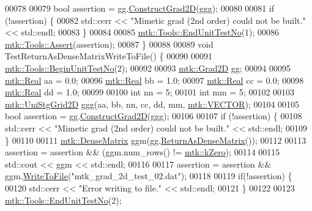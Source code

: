 \begin{DoxyCode}
00078 
00079   \textcolor{keywordtype}{bool} assertion = gg.\hyperlink{classmtk_1_1Grad2D_a9771be954c59880e3d83f4d645378c00}{ConstructGrad2D}(ggg);
00080 
00081   \textcolor{keywordflow}{if} (!assertion) \{
00082     std::cerr << \textcolor{stringliteral}{"Mimetic grad (2nd order) could not be built."} << std::endl;
00083   \}
00084 
00085   \hyperlink{classmtk_1_1Tools_ad8cf0085133dd40c913fe195bc5b9694}{mtk::Tools::EndUnitTestNo}(1);
00086   \hyperlink{classmtk_1_1Tools_aa311fada9255627d06c56b1e4fedce9e}{mtk::Tools::Assert}(assertion);
00087 \}
00088 
00089 \textcolor{keywordtype}{void} TestReturnAsDenseMatrixWriteToFile() \{
00090 
00091   \hyperlink{classmtk_1_1Tools_a26ee906d28523378522a75e25c3a4e19}{mtk::Tools::BeginUnitTestNo}(2);
00092 
00093   \hyperlink{classmtk_1_1Grad2D}{mtk::Grad2D} gg;
00094 
00095   \hyperlink{group__c01-roots_gac080bbbf5cbb5502c9f00405f894857d}{mtk::Real} aa = 0.0;
00096   \hyperlink{group__c01-roots_gac080bbbf5cbb5502c9f00405f894857d}{mtk::Real} bb = 1.0;
00097   \hyperlink{group__c01-roots_gac080bbbf5cbb5502c9f00405f894857d}{mtk::Real} cc = 0.0;
00098   \hyperlink{group__c01-roots_gac080bbbf5cbb5502c9f00405f894857d}{mtk::Real} dd = 1.0;
00099 
00100   \textcolor{keywordtype}{int} nn = 5;
00101   \textcolor{keywordtype}{int} mm = 5;
00102 
00103   \hyperlink{classmtk_1_1UniStgGrid2D}{mtk::UniStgGrid2D} ggg(aa, bb, nn, cc, dd, mm, \hyperlink{namespacemtk_ga4c54f2a329cfb4e56213b02a259d19e2a3d8cb27a993651a74d67fb8c98ae91b2}{mtk::VECTOR});
00104 
00105   \textcolor{keywordtype}{bool} assertion = gg.\hyperlink{classmtk_1_1Grad2D_a9771be954c59880e3d83f4d645378c00}{ConstructGrad2D}(ggg);
00106 
00107   \textcolor{keywordflow}{if} (!assertion) \{
00108     std::cerr << \textcolor{stringliteral}{"Mimetic grad (2nd order) could not be built."} << std::endl;
00109   \}
00110 
00111   \hyperlink{classmtk_1_1DenseMatrix}{mtk::DenseMatrix} ggm(gg.\hyperlink{classmtk_1_1Grad2D_a4f5a17519455f833bb70b8434c272312}{ReturnAsDenseMatrix}());
00112 
00113   assertion = assertion && (ggm.num\_rows() != \hyperlink{group__c01-roots_ga59a451a5fae30d59649bcda274fea271}{mtk::kZero});
00114 
00115   std::cout << ggm << std::endl;
00116 
00117   assertion = assertion && ggm.\hyperlink{classmtk_1_1DenseMatrix_a783d5ea89262d4e2eeb14b9c1ecd0063}{WriteToFile}(\textcolor{stringliteral}{"mtk\_grad\_2d\_test\_02.dat"});
00118 
00119   \textcolor{keywordflow}{if}(!assertion) \{
00120     std::cerr << \textcolor{stringliteral}{"Error writing to file."} << std::endl;
00121   \}
00122 
00123   \hyperlink{classmtk_1_1Tools_ad8cf0085133dd40c913fe195bc5b9694}{mtk::Tools::EndUnitTestNo}(2);

\end{DoxyCode}
